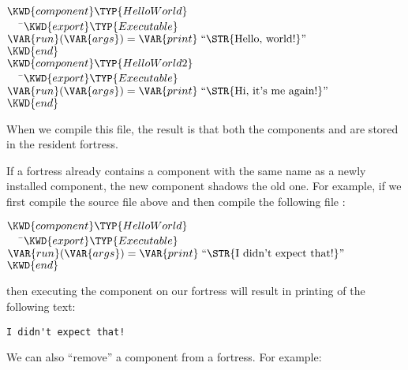 %
\begin{Fortress}
\(\KWD{component} \TYP{HelloWorld}\)\\
{\tt~~~}\pushtabs\=\+\(   \KWD{export} \TYP{Executable}\)\\
\(   \VAR{run}(\VAR{args}) = \VAR{print}\;\hbox{\rm``\STR{Hello,~world!}''}\)\-\\\poptabs
\(\KWD{end}\)\\[4pt]
\(\KWD{component} \TYP{HelloWorld2}\)\\
{\tt~~~}\pushtabs\=\+\(   \KWD{export} \TYP{Executable}\)\\
\(   \VAR{run}(\VAR{args}) = \VAR{print}\;\hbox{\rm``\STR{Hi,~it's~me~again!}''}\)\-\\\poptabs
\(\KWD{end}\)
\end{Fortress}

When we compile this file, the result is that both the components
 and  are stored in the resident fortress.

If a fortress already contains a component with the same name as a
newly installed component, the new component shadows the old one. For
example, if we first compile the source file 
above and then compile the following file :

\begin{Fortress}
\(\KWD{component} \TYP{HelloWorld}\)\\
{\tt~~~}\pushtabs\=\+\(   \KWD{export} \TYP{Executable}\)\\
\(   \VAR{run}(\VAR{args}) = \VAR{print}\;\hbox{\rm``\STR{I~didn't~expect~that!}''}\)\-\\\poptabs
\(\KWD{end}\)
\end{Fortress}

then executing the component  on our fortress will result in
printing of the following text:

\begin{verbatim}
I didn't expect that!
\end{verbatim}

We can also ``remove'' a component from a fortress.
For example:


